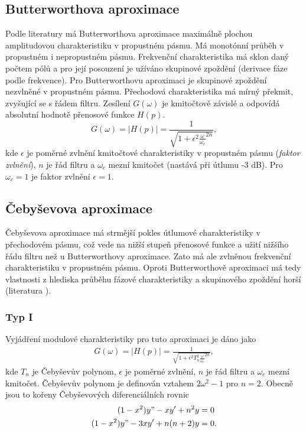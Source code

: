 \subsection{Butterworthova aproximace}
Podle literatury \cite{7} má Butterworthova aproximace maximálně plochou amplitudovou charakteristiku v propustném pásmu. Má monotónní průběh v propustném i nepropustném pásmu. Frekvenční charakteristika má sklon daný počtem pólů a pro její posouzení je užíváno skupinové zpoždění (derivace fáze podle frekvence). Pro Butterworthovu aproximaci je skupinové zpoždění nezvlněné v propustném pásmu. Přechodová charakteristika má mírný překmit, zvyšující se s řádem filtru. Zesílení $G(\omega)$ je kmitočtově závislé a odpovídá absolutní hodnotě přenosové funkce $H(p)$.
\begin{equation}
G(\omega) = |H(p)| = \frac{1}{\sqrt{1 + \epsilon ^2 \frac{\omega}{\omega _c}^{2n}}},
\end{equation}
kde $\epsilon$ je poměrné zvlnění kmitočtové charakteristiky v propustném pásmu (\textit{faktor zvlnění}), $n$ je řád filtru a $\omega _c$ mezní kmitočet (nastává při útlumu -3 dB). Pro $\omega _c = 1$ je faktor zvlnění $\epsilon = 1$. 
\subsection{Čebyševova aproximace}
Čebyševova aproximace má strmější pokles útlumové charakteristiky v přechodovém pásmu, což vede na nižší stupeň přenosové funkce a užití nižšího řádu filtru než u Butterworthovy aproximace. Zato má ale zvlněnou frekvenční charakteristiku v propustném pásmu. Oproti Butterworthově aproximaci má tedy vlastnosti z hlediska průběhu fázové charakteristiky a skupinového zpoždění horší (literatura \cite{10}).
\subsubsection{Typ I}
Vyjádření modulové charakteristiky pro tuto aproximaci je dáno jako
\begin{align}
G(\omega) = |H(p)| = \frac{1}{\sqrt{1 + \epsilon ^2 T_n ^2 \frac{\omega}{\omega _c}^{2n}}},
\end{align}
kde $T_n$ je Čebyševův polynom, $\epsilon$ je poměrné zvlnění, $n$ je řád filtru a $\omega _c$ mezní kmitočet. Čebyševův polynom je definován vztahem $2 \omega ^2 - 1$ pro $n = 2$. Obecně jsou to kořeny Čebyševových diferenciálních rovnic
\begin{align}
(1 - x^2)y" - xy' + n^2y &= 0\\
(1 - x^2)y" - 3xy' + n(n+2)y &= 0.
\end{align}
